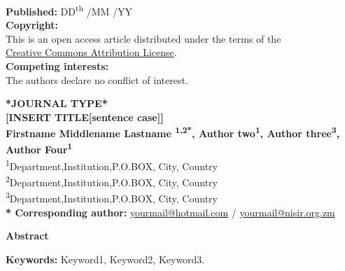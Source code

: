 \begin{minipage}{\textwidth}
\begin{minipage}[t]{0.35\textwidth}
\begin{leftinfobox}
      \textbf{Published:} DD\textsuperscript{th} /MM /YY \\[0.5em]

      \textbf{Copyright:} \\
      {\small\faCopyright} This is an open access article distributed under the terms of the \\
      \href{https://creativecommons.org/licenses/by/4.0/}{Creative Commons Attribution License}. \\[0.5em]

      \textbf{Competing interests:} \\
      The authors declare no conflict of interest.
    \end{leftinfobox}
  \end{minipage}%
  \hfill
  \begin{minipage}[t]{0.62\textwidth}
    \textbf{*JOURNAL TYPE*} \\[0.6em]

    {\Large\bfseries [INSERT TITLE[sentence case]]} \\[1em]

    \small
    \textbf{Firstname Middlename Lastname \textsuperscript{1,2*}, Author two\textsuperscript{1}, Author three\textsuperscript{3}, Author Four\textsuperscript{1}} \\[0.5em]

    \textsuperscript{1}Department,Institution,P.O.BOX, City, Country \\
    \textsuperscript{2}Department,Institution,P.O.BOX, City, Country \\
    \textsuperscript{3}Department,Institution,P.O.BOX, City, Country \\[0.5em]

    \textbf{* Corresponding author:} \href{mailto:yourmail@hotmail.com}{yourmail@hotmail.com} / \href{mailto:yourmail@nisir.org.zm}{yourmail@nisir.org.zm}

    \vspace{1em}
    \normalsize
    \textbf{Abstract} \\[0.25em]
    \justifying
    \lipsum[1] %

    \vspace{1em}
    \textbf{Keywords:} Keyword1, Keyword2, Keyword3.
  \end{minipage}

\end{minipage}

\clearpage
